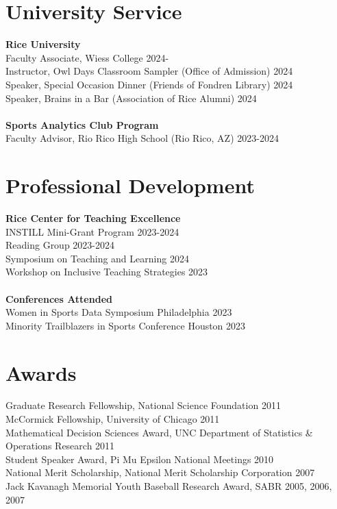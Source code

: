\documentclass{article}
\begin{document}
\section*{\sc University Service}

{\bf Rice University}\\
Faculty Associate, Wiess College \hfill 2024-\\
Instructor, Owl Days Classroom Sampler (Office of Admission) \hfill 2024\\
Speaker, Special Occasion Dinner (Friends of Fondren Library) \hfill 2024\\
Speaker, Brains in a Bar (Association of Rice Alumni) \hfill 2024\\
~\\
{\bf Sports Analytics Club Program}\\
Faculty Advisor, Rio Rico High School (Rio Rico, AZ) \hfill 2023-2024

\section*{\sc Professional Development}

{\bf Rice Center for Teaching Excellence}\\
INSTILL Mini-Grant Program \hfill 2023-2024\\
Reading Group \hfill 2023-2024\\
Symposium on Teaching and Learning \hfill 2024\\
Workshop on Inclusive Teaching Strategies \hfill 2023\\
~\\
{\bf Conferences Attended}\\
Women in Sports Data Symposium \hfill Philadelphia 2023\\
Minority Trailblazers in Sports Conference \hfill Houston 2023

\section*{\sc Awards}

Graduate Research Fellowship, National Science Foundation \hfill 2011\\
McCormick Fellowship, University of Chicago \hfill 2011\\
Mathematical Decision Sciences Award, UNC Department of Statistics \& Operations Research \hfill 2011\\
Student Speaker Award, Pi Mu Epsilon National Meetings \hfill 2010\\
National Merit Scholarship, National Merit Scholarship Corporation \hfill 2007\\
Jack Kavanagh Memorial Youth Baseball Research Award, SABR \hfill 2005, 2006, 2007
\end{document}
